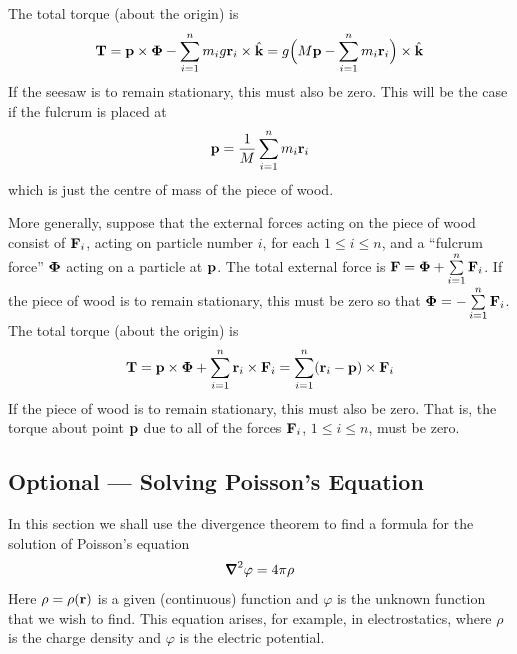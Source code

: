 The total torque (about the origin) is 
\begin{equation*}
\mathbf{T}=\mathbf{p}\times\mathbf{\Phi}-\sum_{i=1}^n m_ig \mathbf{r}_i\times\hat{\mathbf{k}}
=g\Big(M\mathbf{p}-\sum_{i=1}^n m_i \mathbf{r}_i\Big)\times\hat{\mathbf{k}}
\end{equation*}
If the seesaw is to remain stationary, this must also be zero. This will
be the case if the fulcrum is placed at
\begin{equation*}
\mathbf{p}=\frac{1}{M}\sum_{i=1}^n m_i \mathbf{r}_i
\end{equation*}
which is just the centre of mass of the piece of wood.

More generally, suppose that the external forces acting on the piece of wood
consist of $\mathbf{F}_i$, acting on particle number $i$, for each $1\le i\le n$, 
and a ``fulcrum force'' $\mathbf{\Phi}$ acting on a particle at 
$\mathbf{p}$. The total external force is $\mathbf{F}=\mathbf{\Phi}+\sum\limits_{i=1}^n \mathbf{F}_i$. 
If the piece of wood is to remain stationary, this must be zero so that
$\mathbf{\Phi}=-\sum\limits_{i=1}^n \mathbf{F}_i$. The total torque (about the origin) is 
\begin{equation*}
\mathbf{T}=\mathbf{p}\times\mathbf{\Phi}+\sum_{i=1}^n \mathbf{r}_i\times\mathbf{F}_i
=\sum_{i=1}^n (\mathbf{r}_i-\mathbf{p})\times\mathbf{F}_i
\end{equation*}
If the piece of wood is to remain stationary, this must also be zero. 
That is, the torque about point $\mathbf{p}$ due to all of the forces $\mathbf{F}_i$,
$1\le i\le n$, must be zero.



\subsection{Optional --- Solving Poisson's Equation}\label{sec:poisson}

In this section we shall use the divergence theorem to find a formula for the solution of Poisson's equation
\begin{equation*}
\vnabla^2\varphi = 4\pi\rho
\end{equation*}
Here $\rho=\rho(\mathbf{r})$ is a given (continuous) function and $\varphi$ 
is the unknown function that we wish to find.
This equation arises, for example, in electrostatics, where $\rho$ is 
the charge density and $\varphi$ is the electric potential. 

